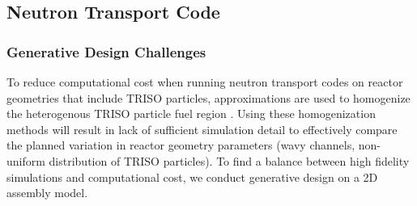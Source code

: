 \subsection{Neutron Transport Code}

\subsubsection{Generative Design Challenges}

To reduce computational cost when running neutron transport codes on 
reactor geometries that include \gls{TRISO} particles, approximations 
are used to homogenize the heterogenous \gls{TRISO} particle fuel region 
\cite{ramey_monte_2018}. 
Using these homogenization methods will result in lack of sufficient simulation detail 
to effectively compare the planned variation in reactor geometry parameters (wavy 
channels, non-uniform distribution of \gls{TRISO} particles).
To find a balance between high fidelity simulations and computational cost, we conduct 
generative design on a 2D assembly model. 




